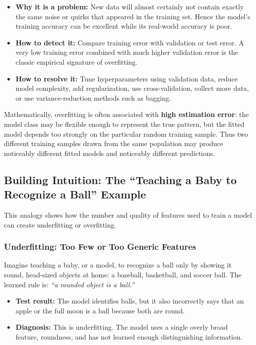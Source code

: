 \documentclass[12pt,openany]{book}
\begin{document}
\begin{itemize}[leftmargin=*]
    \item \textbf{Why it is a problem:} New data will almost certainly not contain exactly the same noise or quirks that appeared in the training set. Hence the model's training accuracy can be excellent while its real-world accuracy is poor.
    \item \textbf{How to detect it:} Compare training error with validation or test error. A very low training error combined with much higher validation error is the classic empirical signature of overfitting.
    \item \textbf{How to resolve it:} Tune hyperparameters using validation data, reduce model complexity, add regularization, use cross-validation, collect more data, or use variance-reduction methods such as bagging.
\end{itemize}

Mathematically, overfitting is often associated with \textbf{high estimation error}: the model class may be flexible enough to represent the true pattern, but the fitted model depends too strongly on the particular random training sample. Thus two different training samples drawn from the same population may produce noticeably different fitted models and noticeably different predictions.

\subsection{Building Intuition: The ``Teaching a Baby to Recognize a Ball'' Example}

This analogy shows how the number and quality of features used to train a model can create underfitting or overfitting.

\subsubsection{Underfitting: Too Few or Too Generic Features}

Imagine teaching a baby, or a model, to recognize a ball only by showing it round, head-sized objects at home: a baseball, basketball, and soccer ball. The learned rule is: \textit{``a rounded object is a ball.''}

\begin{itemize}[leftmargin=*]
    \item \textbf{Test result:} The model identifies balls, but it also incorrectly says that an apple or the full moon is a ball because both are round.
    \item \textbf{Diagnosis:} This is underfitting. The model uses a single overly broad feature, roundness, and has not learned enough distinguishing information.
\end{itemize}
\end{document}
